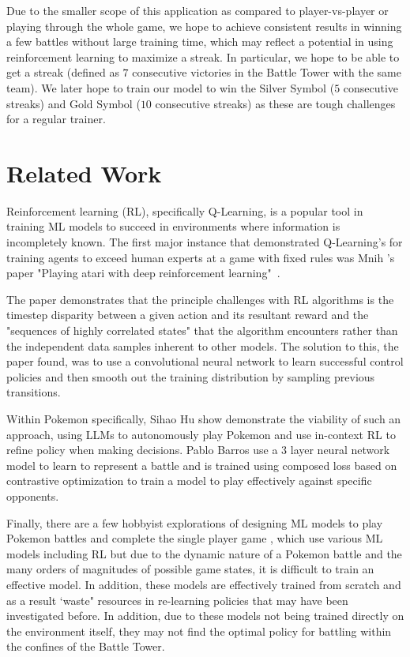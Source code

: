 \documentclass[10pt,twocolumn,letterpaper]{article}
\begin{document}
Due to the smaller scope of this application as compared to player-vs-player or playing through the whole game,
we hope to achieve consistent results in winning a few battles without large training time,
which may reflect a potential in using reinforcement learning to maximize a streak. In particular, we hope to be able to get a streak (defined as $7$ consecutive victories in the Battle Tower with the same team). We later hope to train our model to win the Silver Symbol ($5$ consecutive streaks) and Gold Symbol ($10$ consecutive streaks) as these are tough challenges for a regular trainer.

\section{Related Work}

\par{Reinforcement learning (RL), specifically Q-Learning, is a popular tool in training ML models to succeed in environments where information is incompletely known. The first major instance that demonstrated Q-Learning's for training agents to exceed human experts at a game with fixed rules was Mnih \etal's paper "Playing atari with deep reinforcement learning"~\cite{Mnih}.}
\par{The paper demonstrates that the principle challenges with RL algorithms is the timestep disparity between a given action and its resultant reward and the "sequences of highly correlated states" that the algorithm encounters rather than the independent data samples inherent to other models. The solution to this, the paper found, was to use a convolutional neural network to learn successful control policies and then smooth out the training distribution by sampling previous transitions.}
\par{Within Pokemon specifically, Sihao Hu \etal \cite{Hu} show demonstrate the viability of such an approach, using LLMs to autonomously play Pokemon and use in-context RL to refine policy when making decisions. Pablo Barros \etal \cite{Barros} use a 3 layer neural network model to learn to represent a battle and is trained using composed loss based on contrastive optimization to train a model to play effectively against specific opponents.}
\par{Finally, there are a few hobbyist explorations of designing ML models to play Pokemon battles \cite{Whiddy} and complete the single player game \cite{Compton}, which use various ML models including RL but due to the dynamic nature of a Pokemon battle and the many orders of magnitudes of possible game states, it is difficult to train an effective model. In addition, these models are effectively trained from scratch and as a result `waste" resources in re-learning policies that may have been investigated before. In addition, due to these models not being trained directly on the environment itself, they may not find the optimal policy for battling within the confines of the Battle Tower.}
\end{document}
